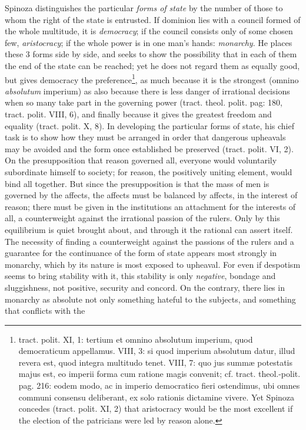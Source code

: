 \documentclass[12pt,a4paper,openany]{book}
\newcommand{\opage}[1]{\marginnote{\footnotesize\textit{[#1]}}}
\begin{document}
Spinoza distinguishes the particular \emph{forms of state} by the number of those to whom the right of the state is entrusted. If dominion lies with a council formed of the whole multitude, it is \emph{democracy}; if the council consists only of some chosen few, \emph{aristocracy}; if the whole power is in one man's hands: \emph{monarchy}. He places these 3 forms side by side, and seeks to show the possibility that in each of them the end of the state can be reached; yet he does not regard them as equally
\opage{144}\setcounter{footnote}{0}good, but gives democracy the preference\footnote{tract. polit. XI, 1: tertium et omnino absolutum imperium, quod democraticum appellamus. VIII, 3: si quod imperium absolutum datur, illud revera est, quod integra multitudo tenet. VIII, 7: quo jus summæ potestatis majus est, eo imperii forma cum ratione magis convenit; cf. tract. theol.-polit. pag. 216: eodem modo, ac in imperio democratico fieri ostendimus, ubi omnes communi consensu deliberant, ex solo rationis dictamine vivere. Yet Spinoza concedes (tract. polit. XI, 2) that aristocracy would be the most excellent if the election of the patricians were led by reason alone.}, as much because it is the strongest (omnino \emph{absolutum} imperium) as also because there is less danger of irrational decisions when so many take part in the governing power (tract. theol. polit. pag: 180, tract. polit. VIII, 6), and finally because it gives the greatest freedom and equality (tract. polit. X, 8). In developing the particular forms of state, his chief task is to show how they must be arranged in order that dangerous upheavals may be avoided and the form once established be preserved (tract. polit. VI, 2). On the presupposition that reason governed all, everyone would voluntarily subordinate himself to society; for reason, the positively uniting element, would bind all together. But since the presupposition is that the mass of men is governed by the affects, the affects must be balanced by affects, in the interest of reason; there must be given in the institutions an attachment for the interests of all, a counterweight against the irrational passion of the rulers. Only by this equilibrium is quiet brought about, and through it the rational can assert itself. The necessity of finding a counterweight against the passions of the rulers and a guarantee for the continuance of the form of state appears most strongly in monarchy, which by its nature is most exposed to upheaval. For even if despotism seems to bring stability with it, this stability is only \emph{negative}, bondage and sluggishness, not positive, security and concord. On the contrary, there lies in monarchy as absolute not only something hateful to the subjects, and something that conflicts with the
\end{document}

